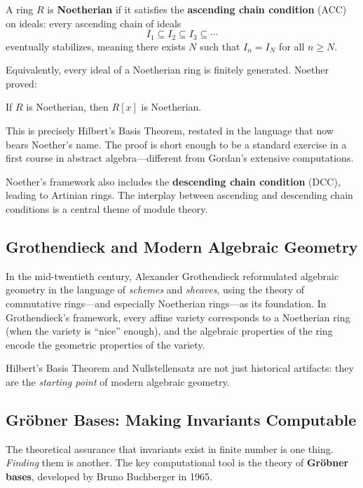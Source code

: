 \begin{definition}
A ring $R$ is \textbf{Noetherian} if it satisfies the \textbf{ascending chain condition} (ACC) on ideals: every ascending chain of ideals
\[
    I_1 \subseteq I_2 \subseteq I_3 \subseteq \cdots
\]
eventually stabilizes, meaning there exists $N$ such that $I_n = I_N$ for all $n \geq N$.
\end{definition}

Equivalently, every ideal of a Noetherian ring is finitely generated. Noether proved:

\begin{theorem}[Noether, 1921]\label{thm:noether}
If $R$ is Noetherian, then $R[x]$ is Noetherian.
\end{theorem}

This is precisely Hilbert's Basis Theorem, restated in the language that now bears Noether's name. The proof is short enough to be a standard exercise in a first course in abstract algebra---different from Gordan's extensive computations.

Noether's framework also includes the \textbf{descending chain condition} (DCC), leading to Artinian rings. The interplay between ascending and descending chain conditions is a central theme of module theory.

\subsection{Grothendieck and Modern Algebraic Geometry}

In the mid-twentieth century, Alexander Grothendieck reformulated algebraic geometry in the language of \emph{schemes} and \emph{sheaves}, using the theory of commutative rings---and especially Noetherian rings---as its foundation. In Grothendieck's framework, every affine variety corresponds to a Noetherian ring (when the variety is ``nice'' enough), and the algebraic properties of the ring encode the geometric properties of the variety.

Hilbert's Basis Theorem and Nullstellensatz are not just historical artifacts: they are the \emph{starting point} of modern algebraic geometry.

\subsection{Gr\"obner Bases: Making Invariants Computable}

The theoretical assurance that invariants exist in finite number is one thing. \emph{Finding} them is another. The key computational tool is the theory of \textbf{Gr\"obner bases}, developed by Bruno Buchberger in 1965.

